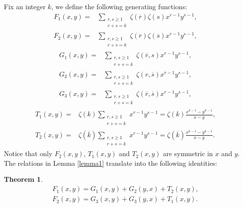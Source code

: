 \documentclass[reqno]{amsart}
\newtheorem{theorem}{Theorem}[section]
\theoremstyle{definition}
\theoremstyle{remark}
\numberwithin{equation}{section}
\begin{document}
Fix an integer $k$,  we define the following generating functions:
\begin{align*}
F_1(x,y)=&\sum_{\substack{r, s\geq 1\\ r+s=k}} \zeta(\overline{r})\zeta(s)x^{r-1}y^{s-1},\\
F_2(x,y)=&\sum_{\substack{r, s\geq 1\\ r+s=k}}  \zeta(\overline{r})\zeta(\overline{s})x^{r-1}y^{s-1},\end{align*}\begin{align*}
G_1(x, y)=&\sum_{\substack{r, s\geq 1\\ r+s=k}}  \zeta(\overline{r}, s)x^{r-1}y^{s-1},\\
G_2(x, y)=&\sum_{\substack{r, s\geq 1\\ r+s=k}}  \zeta(r, \overline{s})x^{r-1}y^{s-1},\\G_3(x, y)=&\sum_{\substack{r, s\geq 1\\ r+s=k}}  \zeta(\overline{r}, \overline{s})x^{r-1}y^{s-1},\end{align*}\begin{align*}
T_1(x,y)=&\zeta(k)\sum_{\substack{r, s\geq 1\\ r+s=k}} x^{r-1}y^{s-1}=\zeta(k)\frac{x^{k-1}-y^{k-1}}{x-y},\\
T_2(x,y)=&\zeta(\overline{k})\sum_{\substack{r, s\geq 1\\ r+s=k}} x^{r-1}y^{s-1}=\zeta(\overline{k})\frac{x^{k-1}-y^{k-1}}{x-y}.
\end{align*}
Notice that only $F_2(x,y)$, $T_1(x,y)$ and $T_2(x,y)$  are symmetric in $x$ and $y$.
The relations in Lemma \ref{lemma1} translate into the following identities:
\begin{theorem}\label{R1}
\begin{align}
F_1(x,y)=G_1(x,y)+G_2(y, x)+T_2(x,y),\label{eq17}\\
F_2(x,y)=G_3(x,y)+G_3(y, x)+T_1(x,y).\label{eq18}
\end{align}
\end{theorem}
\end{document}
